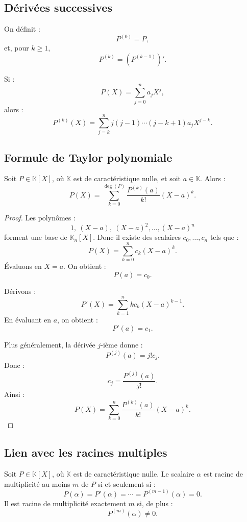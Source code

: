 \documentclass[11pt,a4paper]{article}
\newcommand{\K}{\mathbb K}
\begin{document}
\subsection{Dérivées successives}

On définit :
\[
P^{(0)}=P,
\]
et, pour \(k\geq1\),
\[
P^{(k)}=(P^{(k-1)})'.
\]

\begin{theorembox}
Si :
\[
P(X)=\sum_{j=0}^n a_jX^j,
\]
alors :
\[
P^{(k)}(X)=\sum_{j=k}^n j(j-1)\cdots(j-k+1)a_jX^{j-k}.
\]
\end{theorembox}

\subsection{Formule de Taylor polynomiale}

\begin{theorembox}
Soit \(P\in\K[X]\), où \(\K\) est de caractéristique nulle, et soit \(a\in\K\).  
Alors :
\[
P(X)=\sum_{k=0}^{\deg(P)}
\frac{P^{(k)}(a)}{k!}(X-a)^k.
\]
\end{theorembox}

\begin{proof}
Les polynômes :
\[
1,\ (X-a),\ (X-a)^2,\dots,(X-a)^n
\]
forment une base de \(\K_n[X]\).  
Donc il existe des scalaires \(c_0,\dots,c_n\) tels que :
\[
P(X)=\sum_{k=0}^n c_k(X-a)^k.
\]
Évaluons en \(X=a\).  
On obtient :
\[
P(a)=c_0.
\]

Dérivons :
\[
P'(X)=\sum_{k=1}^n kc_k(X-a)^{k-1}.
\]
En évaluant en \(a\), on obtient :
\[
P'(a)=c_1.
\]

Plus généralement, la dérivée \(j\)-ième donne :
\[
P^{(j)}(a)=j!c_j.
\]
Donc :
\[
c_j=\frac{P^{(j)}(a)}{j!}.
\]
Ainsi :
\[
P(X)=\sum_{k=0}^n
\frac{P^{(k)}(a)}{k!}(X-a)^k.
\]
\end{proof}

\subsection{Lien avec les racines multiples}

\begin{theorembox}
Soit \(P\in\K[X]\), où \(\K\) est de caractéristique nulle.  
Le scalaire \(\alpha\) est racine de multiplicité au moins \(m\) de \(P\) si et seulement si :
\[
P(\alpha)=P'(\alpha)=\cdots=P^{(m-1)}(\alpha)=0.
\]
Il est racine de multiplicité exactement \(m\) si, de plus :
\[
P^{(m)}(\alpha)\neq0.
\]
\end{theorembox}
\end{document}
